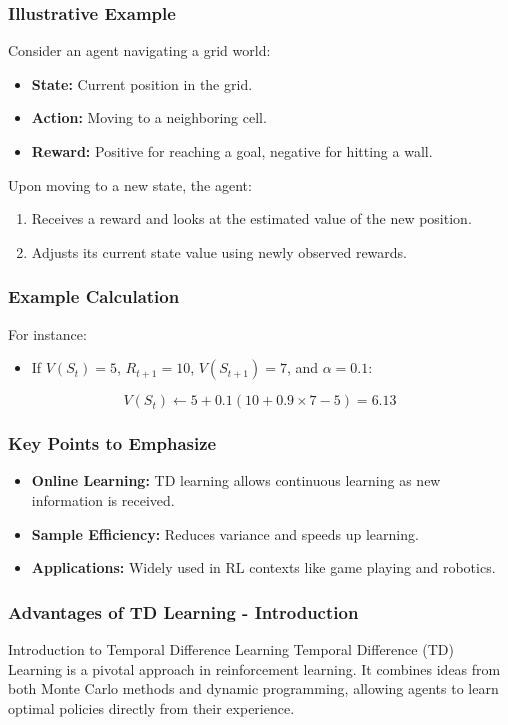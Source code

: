 \documentclass[aspectratio=169]{beamer}
\begin{document}
\begin{frame}[fragile]
    \frametitle{Illustrative Example}
    Consider an agent navigating a grid world:
    \begin{itemize}
        \item \textbf{State:} Current position in the grid.
        \item \textbf{Action:} Moving to a neighboring cell.
        \item \textbf{Reward:} Positive for reaching a goal, negative for hitting a wall.
    \end{itemize}
    Upon moving to a new state, the agent:
    \begin{enumerate}
        \item Receives a reward and looks at the estimated value of the new position.
        \item Adjusts its current state value using newly observed rewards.
    \end{enumerate}
\end{frame}

\begin{frame}[fragile]
    \frametitle{Example Calculation}
    For instance:
    \begin{itemize}
        \item If $V(S_t) = 5$, $R_{t+1} = 10$, $V(S_{t+1}) = 7$, and $\alpha = 0.1$:
    \end{itemize}
    \begin{equation}
        V(S_t) \leftarrow 5 + 0.1 \left( 10 + 0.9 \times 7 - 5 \right) = 6.13
    \end{equation}
\end{frame}

\begin{frame}[fragile]
    \frametitle{Key Points to Emphasize}
    \begin{itemize}
        \item \textbf{Online Learning:} TD learning allows continuous learning as new information is received.
        \item \textbf{Sample Efficiency:} Reduces variance and speeds up learning.
        \item \textbf{Applications:} Widely used in RL contexts like game playing and robotics.
    \end{itemize}
\end{frame}

\begin{frame}[fragile]
    \frametitle{Advantages of TD Learning - Introduction}
    \begin{block}{Introduction to Temporal Difference Learning}
        Temporal Difference (TD) Learning is a pivotal approach in reinforcement learning. It combines ideas from both Monte Carlo methods and dynamic programming, allowing agents to learn optimal policies directly from their experience.
    \end{block}
\end{frame}
\end{document}

